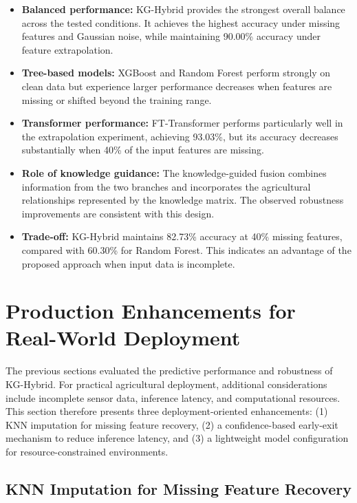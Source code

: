 \documentclass[journal]{IEEEtran}
\begin{document}
\begin{itemize}[leftmargin=1.2em]
    \item \textbf{Balanced performance:} KG-Hybrid provides the strongest overall balance across the tested conditions. It achieves the highest accuracy under missing features and Gaussian noise, while maintaining 90.00\% accuracy under feature extrapolation.

    \item \textbf{Tree-based models:} XGBoost and Random Forest perform strongly on clean data but experience larger performance decreases when features are missing or shifted beyond the training range.

    \item \textbf{Transformer performance:} FT-Transformer performs particularly well in the extrapolation experiment, achieving 93.03\%, but its accuracy decreases substantially when 40\% of the input features are missing.

    \item \textbf{Role of knowledge guidance:} The knowledge-guided fusion combines information from the two branches and incorporates the agricultural relationships represented by the knowledge matrix. The observed robustness improvements are consistent with this design.

    \item \textbf{Trade-off:} KG-Hybrid maintains 82.73\% accuracy at 40\% missing features, compared with 60.30\% for Random Forest. This indicates an advantage of the proposed approach when input data is incomplete.
\end{itemize}


\section{Production Enhancements for Real-World Deployment}

The previous sections evaluated the predictive performance and robustness of KG-Hybrid. For practical agricultural deployment, additional considerations include incomplete sensor data, inference latency, and computational resources. This section therefore presents three deployment-oriented enhancements: (1) KNN imputation for missing feature recovery, (2) a confidence-based early-exit mechanism to reduce inference latency, and (3) a lightweight model configuration for resource-constrained environments.

\subsection{KNN Imputation for Missing Feature Recovery}
\end{document}
